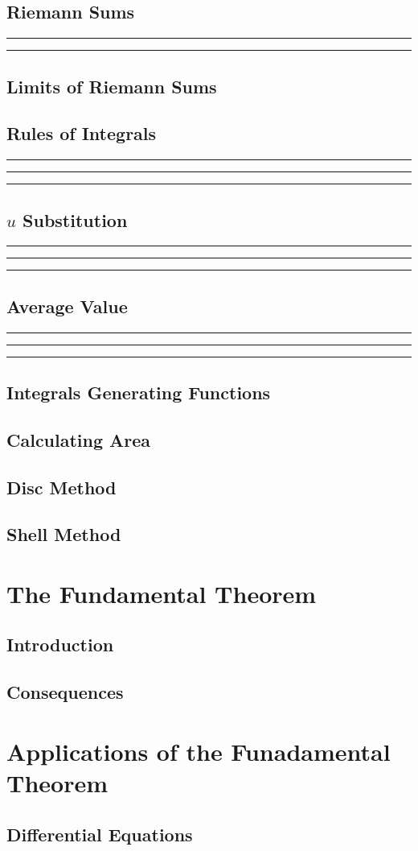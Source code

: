 \documentclass{article}
\newcommand{\newMidline}{\noindent\rule[0.5ex]{\linewidth}{1pt}}
\newcommand{\newchapter}[2]
{
	\subsection{#1}\newMidline\newMidline\newMidline\vspace{.125in}
}
\begin{document}
\subsection{Riemann Sums}\newMidline\newMidline
\subsection{Limits of Riemann Sums}
\newchapter{Rules of Integrals}{RulesOfIntegrals}
\newchapter{$u$ Substitution}{uSub}
\newchapter{Average Value}{AverageValue}
\subsection{Integrals Generating Functions}
\subsection{Calculating Area}
\subsection{Disc Method}
\subsection{Shell Method}
\newpage
\section{The Fundamental Theorem}
\subsection{Introduction}
\subsection{Consequences}
\newpage
\section{Applications of the Funadamental Theorem}
\subsection{Differential Equations}
\end{document}
